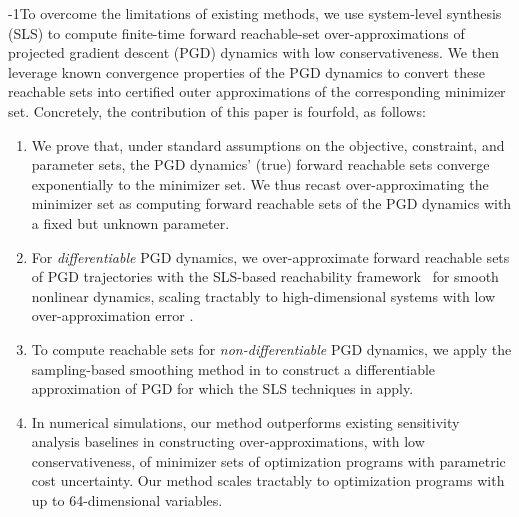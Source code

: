 \documentclass[letterpaper, 10 pt, conference]{ieeeconf}
\newcommand{\?}{\stackrel{?}{=}}
\newcommand{\var}{\xi}
\newcommand{\varOptSet}{S_\var^\star}
\begin{document}
\looseness-1To overcome the limitations of existing methods, we use system-level synthesis (SLS) to compute finite-time forward reachable-set over-approximations of projected gradient descent (PGD) dynamics with low conservativeness. We then leverage known convergence properties of the PGD dynamics 
\cite{WrightRecht2022OptimizationForDataAnalysis} 
to convert these reachable sets into certified outer approximations of the corresponding minimizer set.
Concretely, the contribution of this paper is fourfold, as follows:
\begin{enumerate}
    \item We prove that, under standard assumptions on the objective, constraint, and parameter sets, the PGD dynamics' (true) forward reachable sets converge exponentially to the minimizer set. 
    We thus recast over-approximating the minimizer set as computing forward reachable sets of the PGD dynamics with a fixed but unknown parameter.
    \item For \textit{differentiable} PGD dynamics, we over-approximate forward reachable sets of PGD trajectories with the SLS-based reachability framework~\cite{Leeman2025RobustNonlinearOptimalControlviaSLS} for smooth nonlinear dynamics, scaling tractably to high-dimensional systems with low over-approximation error 
    \cite{Leeman2025RobustNonlinearOptimalControlviaSLS, leeman2026vision, furieri2019input, fang2026safe}.
    \item To compute reachable sets for \textit{non-differentiable} PGD dynamics, we apply the sampling-based smoothing method in \cite{Flaxman2005OnlineConvexOptimization} to construct a differentiable approximation of PGD for which the SLS techniques in \cite{Leeman2025RobustNonlinearOptimalControlviaSLS} apply.
    \item 
    In numerical simulations,
    our method outperforms existing sensitivity analysis baselines in constructing over-approximations, with low conservativeness, of minimizer sets of optimization programs with parametric cost uncertainty. 
    Our method scales tractably to optimization programs with up to 64-dimensional variables.
\end{enumerate}
\end{document}
